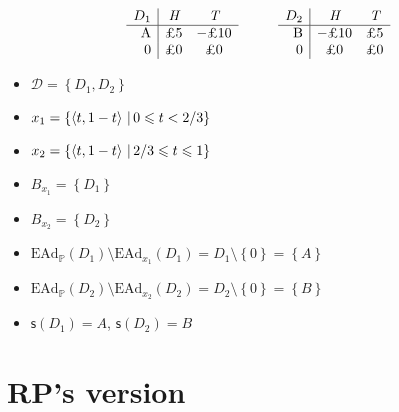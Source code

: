\documentclass[a4paper]{article}
\renewcommand\P{\mathbb{P}} %
\newcommand\EAd{\mathrm{EAd}}
\newcommand{\Decs}{\mathcal{D}}
\newcommand\s{\mathsf{s}}
\newcommand{\IP}{\P}
\newcommand\SetDelimiter[1][]{
	\nonscript\,#1\vert \allowbreak \nonscript\,\mathopen{}}
\providecommand\given{\SetDelimiter}
\renewcommand{\leq}{\leqslant}
\newenvironment{CCM rewritten}
{\begingroup\color{blue}} %
{\endgroup}              %
\begin{document}
$$
\begin{array}{r|cc}
D_1 & \emph{H} &\emph{T} \\\hline 
\text{A} & \text{\pounds 5} & -\text{\pounds 10}  \\
0 & \text{\pounds0} & \text{\pounds 0}  \\
\end{array}
\hspace{10mm}
\begin{array}{r|cc}
D_2 & \emph{H} &\emph{T} \\\hline 
\text{B} & -\text{\pounds 10} & \text{\pounds 5}  \\
0 & \text{\pounds0} & \text{\pounds 0}  \\
\end{array}
$$

\begin{itemize}
\item $\Decs=\left\{ D_1, D_2 \right\}$

\item $x_1=\left\{ \left<t, 1-t\right>\given 0\leq t< 2/3\right\}$
\item $x_2=\left\{ \left<t, 1-t\right>\given 2/3\leq t\leq 1\right\}$

\item $B_{x_1}=\left\{ D_1\right\}$
\item $B_{x_2}=\left\{ D_2\right\}$

\item $\EAd_\IP(D_1)\setminus\EAd_{x_1}(D_1)=D_1\setminus\left\{0\right\}=\left\{A\right\}$

\item $\EAd_\IP(D_2)\setminus\EAd_{x_2}(D_2)=D_2\setminus\left\{0\right\}=\left\{B\right\}$

\item $\s(D_1)=A$, $\s(D_2)=B$
\end{itemize}
\section{RP's version}
\end{document}
